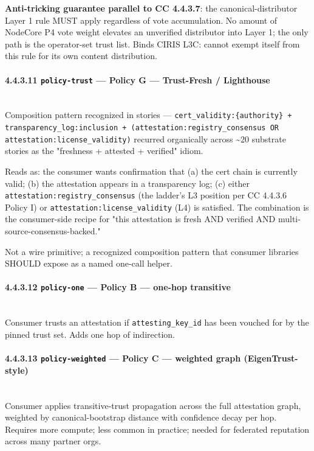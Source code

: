 \documentclass[11pt]{article}
\begin{document}
\textbf{Anti-tricking guarantee parallel to CC 4.4.3.7}: the canonical-distributor Layer 1 rule MUST apply regardless of vote accumulation. No amount of NodeCore P4 vote weight elevates an unverified distributor into Layer 1; the only path is the operator-set trust list. Binds CIRIS L3C: cannot exempt itself from this rule for its own content distribution.


\paragraph{4.4.3.11 \texttt{policy-trust} — Policy G — Trust-Fresh / Lighthouse}\mbox{}\\


Composition pattern recognized in stories — \texttt{cert\_validity:\{authority\} + transparency\_log:inclusion + (attestation:registry\_consensus OR attestation:license\_validity)} recurred organically across \textasciitilde{}20 substrate stories as the "freshness + attested + verified" idiom.


Reads as: the consumer wants confirmation that (a) the cert chain is currently valid; (b) the attestation appears in a transparency log; (c) either \texttt{attestation:registry\_consensus} (the ladder's L3 position per CC 4.4.3.6 Policy I) or \texttt{attestation:license\_validity} (L4) is satisfied. The combination is the consumer-side recipe for "this attestation is fresh AND verified AND multi-source-consensus-backed."


Not a wire primitive; a recognized composition pattern that consumer libraries SHOULD expose as a named one-call helper.


\paragraph{4.4.3.12 \texttt{policy-one} — Policy B — one-hop transitive}\mbox{}\\


Consumer trusts an attestation if \texttt{attesting\_key\_id} has been vouched for by the pinned trust set. Adds one hop of indirection.


\paragraph{4.4.3.13 \texttt{policy-weighted} — Policy C — weighted graph (EigenTrust-style)}\mbox{}\\


Consumer applies transitive-trust propagation across the full attestation graph, weighted by canonical-bootstrap distance with confidence decay per hop. Requires more compute; less common in practice; needed for federated reputation across many partner orgs.
\end{document}
